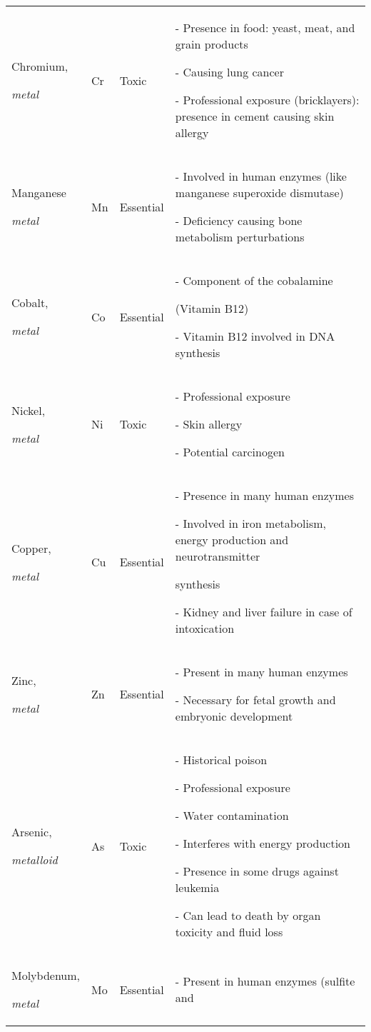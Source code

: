 \begin{center}
\begin{longtable}{p{} p{} p{} p{}}
Chromium, \par \emph{metal} & Cr & Toxic & - Presence in food: yeast, meat, and grain products \par - Causing lung cancer \par - Professional exposure (bricklayers): presence in cement causing skin allergy \\
Manganese \par \emph{metal} & Mn & Essential & - Involved in human enzymes (like manganese superoxide dismutase) \par - Deficiency causing bone metabolism perturbations \\
Cobalt, \par \emph{metal} & Co & Essential & - Component of the cobalamine \par (Vitamin B12) \par - Vitamin B12 involved in DNA synthesis \\
Nickel, \par \emph{metal} & Ni & Toxic & - Professional exposure \par - Skin allergy \par - Potential carcinogen \cite{kasper_harrisons_2015} \\
Copper, \par \emph{metal} & Cu & Essential & - Presence in many human enzymes \par - Involved in iron metabolism, energy production and neurotransmitter \par synthesis \cite{kasper_harrisons_2015} \par - Kidney and liver failure in case of intoxication \\
Zinc, \par \emph{metal} & Zn & Essential & - Present in many human enzymes \par - Necessary for fetal growth and embryonic development \\
Arsenic, \par \emph{metalloid} & As & Toxic & - Historical poison \par - Professional exposure \par - Water contamination \par - Interferes with energy production \par - Presence in some drugs against leukemia \par - Can lead to death by organ toxicity and fluid loss \cite{kasper_harrisons_2015} \\
Molybdenum, \par \emph{metal} & Mo & Essential & - Present in human enzymes (sulfite and

\end{longtable}
\end{center}
